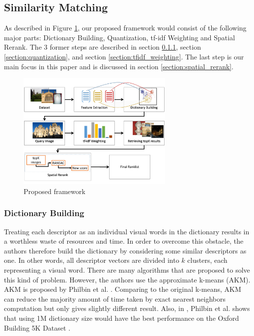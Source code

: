\subsection{Similarity Matching} \label{section:similarity_extraction}

As described in Figure \ref{fig:proposed_framework}, our proposed framework would consist of the following major parts: Dictionary Building, Quantization, tf-idf Weighting and Spatial Rerank. The 3 former steps are described in section \ref{section:dictionary_building}, section \ref{section:quantization}, and section \ref{section:tfidf_weighting}. The last step is our main focus in this paper and is discussed in section \ref{section:spatial_rerank}.

\begin{figure}
    \centering
    \includegraphics[width=3.0in]{process.pdf}
    \caption{Proposed framework}
    \label{fig:proposed_framework}
\end{figure}

\subsubsection{Dictionary Building} \label{section:dictionary_building}
Treating each descriptor as an individual visual words in the dictionary results in a worthless waste of resources and time. In order to overcome this obstacle, the authors therefore build the dictionary by considering some similar descriptors as one. In other words, all descriptor vectors are divided into $k$ clusters, each representing a visual word. There are many algorithms that are proposed to solve this kind of problem. However, the authors use the approximate k-means (AKM). AKM is proposed by Philbin et al. \cite{2}. Comparing to the original k-means, AKM can reduce the majority amount of time taken by exact nearest neighbors computation but only gives slightly different result. Also, in \cite{2}, Philbin et al. shows that using 1M dictionary size would have the best performance on the Oxford Building 5K Dataset \cite{oxbuilding}.

